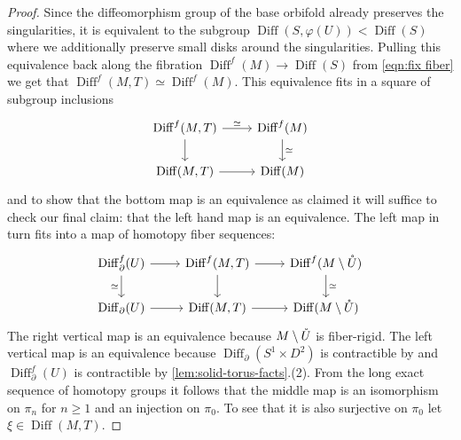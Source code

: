 \documentclass{amsart}
\theoremstyle{plain}
\theoremstyle{definition}
\DeclareMathOperator\Diff{Diff}
\newcommand{\interior}[1]{\smash{\mathring{#1}}}
\begin{document}
\begin{proof}
    Since the diffeomorphism group of the base orbifold already preserves the singularities, it is equivalent to the subgroup $\Diff(S, \varphi(U)) < \Diff(S)$ where we additionally preserve small disks around the singularities.
    Pulling this equivalence back along the fibration $\Diff^f(M) \to \Diff(S)$ from \cref{eqn:fix fiber} we get that $\Diff^f(M, T) \simeq \Diff^f(M)$.
    This equivalence fits in a square of subgroup inclusions
    \[\begin{tikzcd}
    	{\Diff^f(M, T)} & {\Diff^f(M)} \\
    	{\Diff(M, T)} & {\Diff(M)}
    	\arrow[from=1-1, to=2-1]
    	\arrow[from=2-1, to=2-2]
    	\arrow["\simeq", from=1-1, to=1-2]
    	\arrow["\simeq", from=1-2, to=2-2]
    \end{tikzcd}\]
    and to show that the bottom map is an equivalence as claimed it will suffice to check our final claim: that the left hand map is an equivalence.
    The left map in turn fits into a map of homotopy fiber sequences:
\[\begin{tikzcd}
	{\Diff_\partial^f(U)} & {\Diff^f(M, T)} & {\Diff^f(M \setminus \interior{U})} \\
	{\Diff_\partial(U)} & {\Diff(M, T)} & {\Diff(M \setminus \interior{U})}
	\arrow["\simeq"', from=1-1, to=2-1]
	\arrow[from=1-2, to=2-2]
	\arrow["\simeq", from=1-3, to=2-3]
	\arrow[from=2-2, to=2-3]
	\arrow[from=1-2, to=1-3]
	\arrow[from=1-1, to=1-2]
	\arrow[from=2-1, to=2-2]
\end{tikzcd}\]
    The right vertical map is an equivalence because $M\setminus \interior{U}$ is fiber-rigid.
    The left vertical map is an equivalence because $\Diff_\partial(S^1 \times D^2)$ is contractible by \cite{Hatcher76, Ivanov76} and $\Diff_\partial^f(U)$ is contractible by \cref{lem:solid-torus-facts}.(2).
    From the long exact sequence of homotopy groups it follows that the middle map is an isomorphism on $\pi_n$ for $n\ge1$ and an injection on $\pi_0$.
    To see that it is also surjective on $\pi_0$ let $\xi\in \Diff(M, T)$.

\end{proof}
\end{document}
